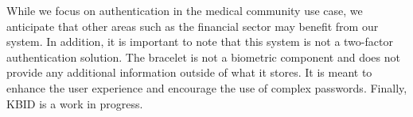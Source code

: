 \documentclass[runningheads,a4paper]{llncs}
\begin{document}
While we focus on authentication in the medical community use case, we anticipate that other areas such as the financial sector may benefit from our system. In addition, it is important to note that this system is not a two-factor authentication solution. The bracelet is not a biometric component and does not provide any additional information outside of what it stores. It is meant to enhance the user experience and encourage the use of complex passwords. Finally, KBID is a work in progress.






\end{document}
